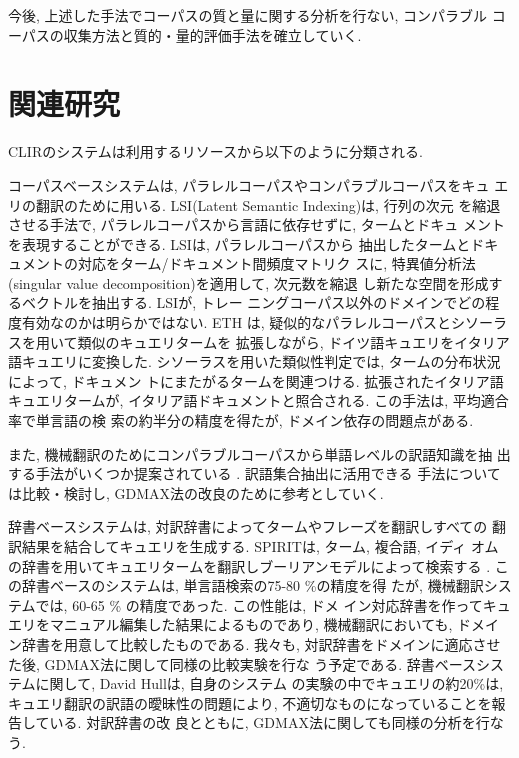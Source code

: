 今後, 上述した手法でコーパスの質と量に関する分析を行ない, コンパラブル
コーパスの収集方法と質的・量的評価手法を確立していく. 




\section{関連研究}

CLIRのシステムは利用するリソースから以下のように分類される\cite{hull97}. 



コーパスベースシステムは, パラレルコーパスやコンパラブルコーパスをキュ
エリの翻訳のために用いる. LSI(Latent Semantic Indexing)は, 行列の次元
を縮退させる手法で, パラレルコーパスから言語に依存せずに, タームとドキュ
メントを表現することができる\cite{14,17}. LSIは, パラレルコーパスから
抽出したタームとドキュメントの対応をターム/ドキュメント間頻度マトリク
スに, 特異値分析法(singular value decomposition)を適用して, 次元数を縮退
し新たな空間を形成するベクトルを抽出する. LSIが, トレー
ニングコーパス以外のドメインでどの程度有効なのかは明らかではない. ETH
は, 疑似的なパラレルコーパスとシソーラスを用いて類似のキュエリタームを
拡張しながら, ドイツ語キュエリをイタリア語キュエリに変換した\cite{26}. 
シソーラスを用いた類似性判定では, タームの分布状況によって, ドキュメン
トにまたがるタームを関連つける. 拡張されたイタリア語キュエリタームが, 
イタリア語ドキュメントと照合される. この手法は, 平均適合率で単言語の検
索の約半分の精度を得たが, ドメイン依存の問題点がある. 

また, 機械翻訳のためにコンパラブルコーパスから単語レベルの訳語知識を抽
出する手法がいくつか提案されている
\cite{Fung95,Fung97,Rappo95,Kaji96,Tanaka96}. 
訳語集合抽出に活用できる
手法については比較・検討し, GDMAX法の改良のために参考としていく. 


辞書ベースシステムは, 対訳辞書によってタームやフレーズを翻訳しすべての
翻訳結果を結合してキュエリを生成する. SPIRITは, ターム, 複合語, イディ
オムの辞書を用いてキュエリタームを翻訳しブーリアンモデルによって検索する
\cite{23}. この辞書ベースのシステムは, 単言語検索の75-80 \%の精度を得
たが, 機械翻訳システムでは, 60-65 \% の精度であった. この性能は, ドメ
イン対応辞書を作ってキュエリをマニュアル編集した結果によるものであり, 
機械翻訳においても, ドメイン辞書を用意して比較したものである. 我々も, 
対訳辞書をドメインに適応させた後, GDMAX法に関して同様の比較実験を行な
う予定である. 辞書ベースシステムに関して, David Hullは, 自身のシステム
の実験の中でキュエリの約20\%は, キュエリ翻訳の訳語の曖昧性の問題により, 
不適切なものになっていることを報告している\cite{hull97}. 対訳辞書の改
良とともに, GDMAX法に関しても同様の分析を行なう. 

